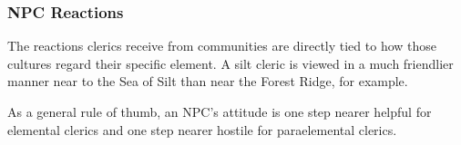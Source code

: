 \subsubsection{NPC Reactions}
The reactions clerics receive from communities are directly tied to how those cultures regard their specific element. A silt cleric is viewed in a much friendlier manner near to the Sea of Silt than near the Forest Ridge, for example.

As a general rule of thumb, an NPC's attitude is one step nearer helpful for elemental clerics and one step nearer hostile for paraelemental clerics.




